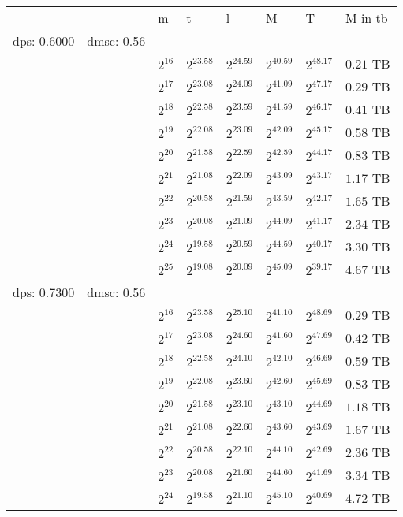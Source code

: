 \begin{tabular}{llllllll}
 &  & m & t & l & M & T & M in tb \\
dps: 0.6000 & dmsc: 0.56 &  &  &  &  &  &  \\
 &  & $2^{16}$ & $2^{23.58}$ & $2^{24.59}$ & $2^{40.59}$ & $2^{48.17}$ & $0.21$ TB \\
 &  & $2^{17}$ & $2^{23.08}$ & $2^{24.09}$ & $2^{41.09}$ & $2^{47.17}$ & $0.29$ TB \\
 &  & $2^{18}$ & $2^{22.58}$ & $2^{23.59}$ & $2^{41.59}$ & $2^{46.17}$ & $0.41$ TB \\
 &  & $2^{19}$ & $2^{22.08}$ & $2^{23.09}$ & $2^{42.09}$ & $2^{45.17}$ & $0.58$ TB \\
 &  & $2^{20}$ & $2^{21.58}$ & $2^{22.59}$ & $2^{42.59}$ & $2^{44.17}$ & $0.83$ TB \\
 &  & $2^{21}$ & $2^{21.08}$ & $2^{22.09}$ & $2^{43.09}$ & $2^{43.17}$ & $1.17$ TB \\
 &  & $2^{22}$ & $2^{20.58}$ & $2^{21.59}$ & $2^{43.59}$ & $2^{42.17}$ & $1.65$ TB \\
 &  & $2^{23}$ & $2^{20.08}$ & $2^{21.09}$ & $2^{44.09}$ & $2^{41.17}$ & $2.34$ TB \\
 &  & $2^{24}$ & $2^{19.58}$ & $2^{20.59}$ & $2^{44.59}$ & $2^{40.17}$ & $3.30$ TB \\
 &  & $2^{25}$ & $2^{19.08}$ & $2^{20.09}$ & $2^{45.09}$ & $2^{39.17}$ & $4.67$ TB \\
dps: 0.7300 & dmsc: 0.56 &  &  &  &  &  &  \\
 &  & $2^{16}$ & $2^{23.58}$ & $2^{25.10}$ & $2^{41.10}$ & $2^{48.69}$ & $0.29$ TB \\
 &  & $2^{17}$ & $2^{23.08}$ & $2^{24.60}$ & $2^{41.60}$ & $2^{47.69}$ & $0.42$ TB \\
 &  & $2^{18}$ & $2^{22.58}$ & $2^{24.10}$ & $2^{42.10}$ & $2^{46.69}$ & $0.59$ TB \\
 &  & $2^{19}$ & $2^{22.08}$ & $2^{23.60}$ & $2^{42.60}$ & $2^{45.69}$ & $0.83$ TB \\
 &  & $2^{20}$ & $2^{21.58}$ & $2^{23.10}$ & $2^{43.10}$ & $2^{44.69}$ & $1.18$ TB \\
 &  & $2^{21}$ & $2^{21.08}$ & $2^{22.60}$ & $2^{43.60}$ & $2^{43.69}$ & $1.67$ TB \\
 &  & $2^{22}$ & $2^{20.58}$ & $2^{22.10}$ & $2^{44.10}$ & $2^{42.69}$ & $2.36$ TB \\
 &  & $2^{23}$ & $2^{20.08}$ & $2^{21.60}$ & $2^{44.60}$ & $2^{41.69}$ & $3.34$ TB \\
 &  & $2^{24}$ & $2^{19.58}$ & $2^{21.10}$ & $2^{45.10}$ & $2^{40.69}$ & $4.72$ TB \\

\end{tabular}
